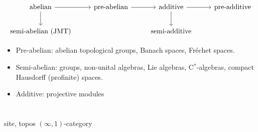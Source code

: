 \documentclass{../../large}
\begin{document}
\begin{prb}
\end{prb}


\[\begin{tikzcd}[math mode=false]
abelian\ar{r}\ar{d} & pre-abelian \ar{r} & additive \ar{r}\ar{d} & pre-additive\\
semi-abelian (JMT) && semi-additive & \,
\end{tikzcd}\]
\begin{itemize}
\item Pre-abelian: abelian topological groups, Banach spaces, Fr\'echet spaces.
\item Semi-abelian: groups, non-unital algebras, Lie algebras, C$^*$-algebras, compact Hausdorff (profinite) spaces.
\item Additive: projective modules
\end{itemize}



\chapter{}
site, topos
$(\infty,1)$-category
\end{document}
